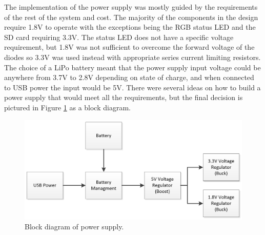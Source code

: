The implementation of the power supply was mostly guided by the requirements of 
the rest of the system and cost. The majority of the components in the design 
require 1.8V to operate with the exceptions being the RGB status LED and the SD 
card requiring 3.3V. The status LED does not have a specific voltage 
requirement, but 1.8V was not sufficient to overcome the forward voltage of the 
diodes so 3.3V was used instead with appropriate series current limiting 
resistors. The choice of a LiPo battery meant that the power supply input 
voltage could be anywhere from 3.7V to 2.8V depending on state of charge, and 
when connected to USB power the input would be 5V. There were several ideas on 
how to build a power supply that would meet all the requirements, but the final 
decision is pictured in Figure \ref{fig:BlockDiagram_PowerSupply} as a block 
diagram.

\begin{figure}[!htb]
\centering
\includegraphics[width=\textwidth]{images/BlockDiagram_PowerSupply.png}
\caption{Block diagram of power supply.}
\label{fig:BlockDiagram_PowerSupply}
\end{figure}

